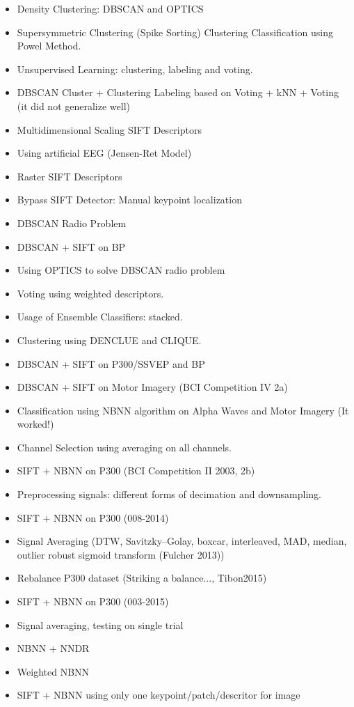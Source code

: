 \begin{itemize}
\item Density Clustering: DBSCAN and OPTICS
\item Supersymmetric Clustering (Spike Sorting)
\teim Clustering Classification using Powel Method.
\item Unsupervised Learning: clustering, labeling and voting.
\item DBSCAN Cluster + Clustering Labeling based on Voting + kNN + Voting (it did not generalize well)
\item Multidimensional Scaling SIFT Descriptors
\item Using artificial EEG (Jensen-Ret Model)
\item Raster SIFT Descriptors
\item Bypass SIFT Detector: Manual keypoint localization
\item DBSCAN Radio Problem
\item DBSCAN + SIFT on BP
\item Using OPTICS to solve DBSCAN radio problem
\item Voting using weighted descriptors.
\item Usage of Ensemble Classifiers: stacked.
\item Clustering using DENCLUE and CLIQUE.
\item DBSCAN + SIFT on P300/SSVEP and BP
\item DBSCAN + SIFT on Motor Imagery (BCI Competition IV 2a)
\item Classification using NBNN algorithm on Alpha Waves and Motor Imagery (It worked!)
\item Channel Selection using averaging on all channels.
\item SIFT + NBNN on P300 (BCI Competition II 2003, 2b)
\item Preprocessing signals: different forms of decimation and downsampling.
\item SIFT + NBNN on P300 (008-2014)
\item Signal Averaging (DTW, Savitzky–Golay, boxcar, interleaved, MAD, median, outlier robust sigmoid transform (Fulcher 2013))
\item Rebalance P300 dataset (Striking a balance..., Tibon2015)
\item SIFT + NBNN on P300 (003-2015)
\item Signal averaging, testing on single trial
\item NBNN + NNDR
\item Weighted NBNN
\item SIFT + NBNN using only one keypoint/patch/descritor for image

\end{itemize}
